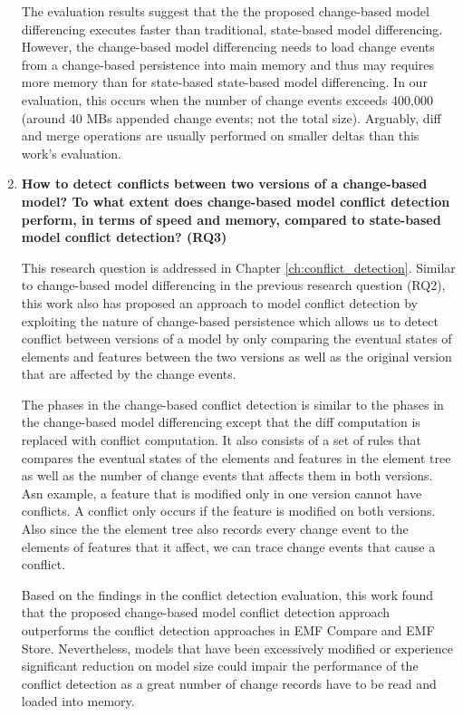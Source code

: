 \begin{enumerate}
 The evaluation results suggest that the the proposed change-based model differencing executes faster than traditional, state-based model differencing.
 However, the change-based model differencing needs to load change events from a change-based persistence into main memory and thus may requires more memory than for state-based state-based model differencing. In our evaluation, this occurs when the number of change events exceeds 400,000 (around 40 MBs appended change events; not the total size). Arguably, diff and merge operations are usually performed on smaller deltas than this work's evaluation.
  
  \item \textbf{How to detect conflicts between two versions of a change-based model? To what extent does change-based model conflict detection perform, in terms of speed and memory, compared to state-based model conflict detection? (RQ3)} 
  
  This research question is addressed in Chapter \ref{ch:conflict_detection}.  Similar to change-based model differencing in the previous research question (RQ2), this work also has proposed an approach to model conflict detection by exploiting the nature of change-based persistence which allows us to detect conflict between versions of a model by only comparing the eventual states of elements and features between the two versions as well as the original version that are affected by the change events.
  
  The phases in the change-based conflict detection is similar to the phases in the change-based model differencing except that the diff computation is replaced with conflict computation. It also consists of a set of rules that compares the eventual states of the elements and features in the element tree as well as the number of change events that affects them in both versions. Asn example, a feature that is modified only in one version cannot have conflicts. A conflict only occurs if the feature is modified on both versions. Also since the the element tree also records every change event to the elements of features that it affect, we can trace change events that cause a conflict.
  
Based on the findings in the conflict detection evaluation, this work found that the proposed change-based model conflict detection approach outperforms the conflict detection approaches in EMF Compare and EMF Store. Nevertheless, models that have been excessively modified or experience significant reduction on model size could impair the performance of the conflict detection as a great number of change records have to be read and loaded into memory.
  
\end{enumerate}

